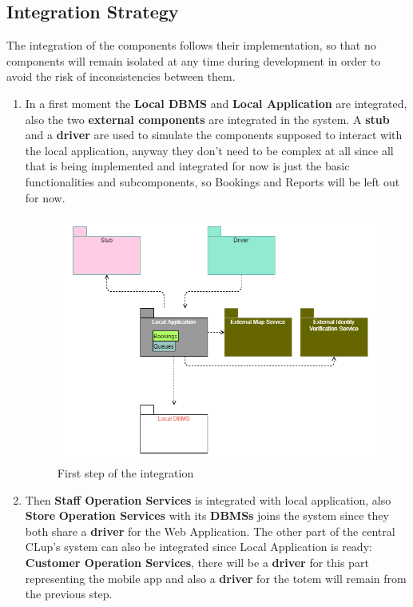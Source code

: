 \subsection{Integration Strategy}
The integration of the components follows their implementation, so that no components will remain isolated at any time during development in order to avoid the risk of inconsistencies between them.
\begin{enumerate}
	\item In a first moment the \textbf{Local DBMS} and \textbf{Local Application} are integrated, also the two \textbf{external components} are integrated in the system. A \textbf{stub} and a \textbf{driver} are used to simulate the components supposed to interact with the local application, anyway they don’t need to be complex at all since all that is being implemented and integrated for now is just the basic functionalities and subcomponents, so Bookings and Reports will be left out for now.
	\begin{figure}[H]
		\includegraphics[width=\linewidth]{../Diagrams/IntegrationImplementation/Integration1st.png}
		\caption{First step of the integration}
		\label{fig:Implementation2}
	\end{figure}
	\item Then \textbf{Staff Operation Services} is integrated with local application, also \textbf{Store} \textbf{Operation Services} with its \textbf{DBMSs} joins the system since they both share a \textbf{driver} for the Web Application. The other part of the central CLup’s system can also be integrated since Local Application is ready: \textbf{Customer Operation Services}, there will be a \textbf{driver} for this part representing the mobile app and also a \textbf{driver} for the totem will remain from the previous step.

\end{enumerate}
